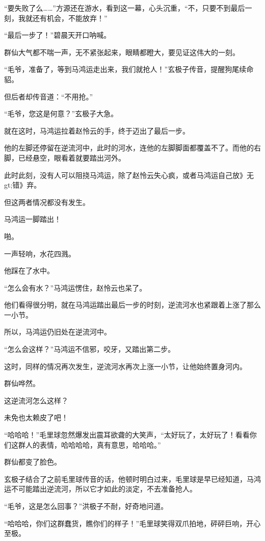 
\begin{this_body}

“要失败了么……”方源还在游水，看到这一幕，心头沉重，“不，只要不到最后一刻，我就还有机会，不能放弃！”

“最后一步了！”碧晨天开口呐喊。

群仙大气都不喘一声，无不紧张起来，眼睛都瞪大，要见证这伟大的一刻。

“毛爷，准备了，等到马鸿运走出来，我们就抢人！”玄极子传音，提醒狗尾续命貂。

但后者却传音道：“不用抢。”

“毛爷，您这是何意？”玄极子大急。

就在这时，马鸿运拉着赵怜云的手，终于迈出了最后一步。

他的左脚还停留在逆流河中，此时的河水，连他的左脚脚面都覆盖不了。而他的右脚，已经悬空，眼看着就要踏出河外。

此时此刻，没有人可以阻挠马鸿运，除了赵怜云失心疯，或者马鸿运自己放》无gt;错》弃。

但这两者情况都没有发生。

马鸿运一脚踏出！

啪。

一声轻响，水花四溅。

他踩在了水中。

“怎么会有水？”马鸿运愣住，赵怜云也呆了。

他们看得很分明，就在马鸿运踏出最后一步的时刻，逆流河水也紧跟着上涨了那么一小节。

所以，马鸿运仍旧处在逆流河中。

“怎么会这样？”马鸿运不信邪，咬牙，又踏出第二步。

这时，同样的情况再次发生，逆流河水再次上涨一小节，让他始终置身河内。

群仙哗然。

这逆流河怎么这样？

未免也太赖皮了吧！

“哈哈哈！”毛里球忽然爆发出震耳欲聋的大笑声，“太好玩了，太好玩了！看看你们这群人的表情，哈哈哈哈，真有意思，哈哈哈。”

群仙都变了脸色。

玄极子结合了之前毛里球传音的话，他顿时明白过来，毛里球是早已经知道，马鸿运不可能踏出逆流河，所以它才如此的淡定，不去准备抢人。

“毛爷，这是怎么回事？”洪极子不耐，好奇地问道。

“哈哈哈，你们这群蠢货，瞧你们的样子！”毛里球笑得双爪拍地，砰砰巨响，开心至极。


\end{this_body}
